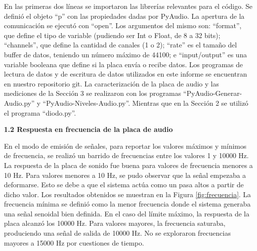 \documentclass[a4paper,10pt]{article}
\begin{document}
En las primeras dos líneas se importaron las librerías relevantes para el código. Se definió el objeto ``p'' con las propiedades dadas por PyAudio. La apertura de la comunicación se ejecutó con ``open''. Los argumentos del mismo son: ``format'', que define el tipo de variable (pudiendo ser Int o Float, de 8 a 32 bits); ``channels'', que define la cantidad de canales (1 o 2); ``rate'' es el tamaño del buffer de datos, teniendo un número máximo de 44100; e ``input/output'' es una variable booleana que define si la placa envía o recibe datos. 
Los programas de lectura de datos y de escritura de datos utilizados en este informe se encuentran en nuestro repositorio git. La caracterización de la placa de audio y las mediciones de la Sección 3 se realizaron con los programas ``PyAudio-Generar-Audio.py'' y ``PyAudio-Niveles-Audio.py''. Mientras que en la Sección 2 se utilizó el programa ``diodo.py''. 

\vspace{0.5cm} \noindent
\textbf{\large 1.2 Respuesta en frecuencia de la placa de audio} \vspace{0.25cm}

En el modo de emisión de señales, para reportar los valores máximos y mínimos de frecuencia, se realizó un barrido de frecuencias entre los valores 1 y 10000 Hz. La respuesta de la placa de sonido fue buena para valores de frecuencia menores a 10 Hz. Para valores menores a 10 Hz, se pudo observar que la señal empezaba a deformarse. Esto se debe a que el sistema actúa como un pasa altos a partir de dicho valor. Los resultados obtenidos se muestran en la Figura \ref{fig:frecuencia}. La frecuencia mínima se definió como la menor frecuencia donde el sistema generaba una señal senoidal bien definida. En el caso del límite máximo, la respuesta de la placa alcanzó los 10000 Hz. Para valores mayores, la frecuencia saturaba, produciendo una señal de salida de 10000 Hz. No se exploraron frecuencias mayores a 15000 Hz por cuestiones de tiempo.
\end{document}
